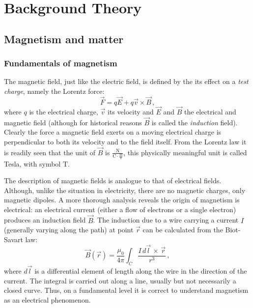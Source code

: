 
\chapter{Background Theory}

\label{ch:background}

\section{Magnetism and matter}

\subsection{Fundamentals of magnetism}

The magnetic field, just like the electric field, is defined by the its effect on a \textit{test charge}, namely the Lorentz force:
\begin{equation}
\vec{F} = q\vec{E} + q\vec{v}\times\vec{B}\, ,
\end{equation}
where $q$ is the electrical charge, $\vec{v}$ its velocity and $\vec{E}$ and $\vec{B}$ the electrical and magnetic field (although for historical reasons $\vec{B}$ is called the \textit{induction} field). Clearly the force a magnetic field exerts on a moving electrical charge is perpendicular to both its velocity and to the field itself. From the Lorentz law it is readily seen that the unit of $\vec{B}$ is $\frac{\mathrm{N}}{\mathrm{C}\cdot\frac{\mathrm{m}}{\mathrm{s}}}$, this physically meaningful unit is called Tesla, with symbol $\mathrm{T}$.

The description of magnetic fields is analogue to that of electrical fields. Although, unlike the situation in electricity, there are no magnetic charges, only magnetic dipoles. A more thorough analysis reveals the origin of magnetism is electrical: an electrical current (either a flow of electrons or a single electron) produces an induction field $\vec{B}$. The induction due to a wire carrying a current $I$ (generally varying along the path) at point $\vec{r}$ can be calculated from the Biot-Savart law:
\begin{equation}
\vec{B}(\vec{r}) = \frac{\mu_0}{4\pi} \int_C \frac{I\, d\vec{l}\, \times \, \vec{r}}{r^3} \, ,
\end{equation}
where $d\vec{l}$ is a differential element of length along the wire in the direction of the current. The integral is carried out along a line, usually but not necessarily a closed curve. Thus, on a fundamental level it is correct to understand magnetism as an electrical phenomenon.\par

